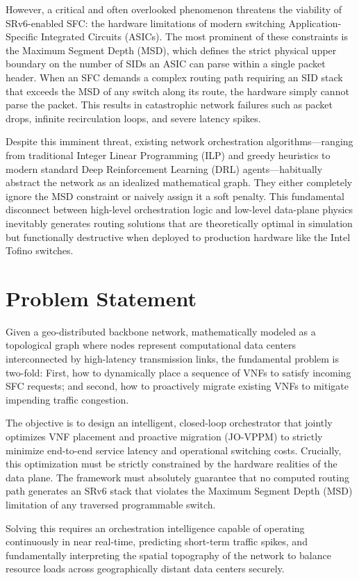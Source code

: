 \documentclass[12pt, a4paper, reqno, oneside]{book}
\begin{document}
However, a critical and often overlooked phenomenon threatens the viability of SRv6-enabled SFC: the hardware limitations of modern switching Application-Specific Integrated Circuits (ASICs). The most prominent of these constraints is the Maximum Segment Depth (MSD), which defines the strict physical upper boundary on the number of SIDs an ASIC can parse within a single packet header. When an SFC demands a complex routing path requiring an SID stack that exceeds the MSD of any switch along its route, the hardware simply cannot parse the packet. This results in catastrophic network failures such as packet drops, infinite recirculation loops, and severe latency spikes. 

Despite this imminent threat, existing network orchestration algorithms—ranging from traditional Integer Linear Programming (ILP) and greedy heuristics to modern standard Deep Reinforcement Learning (DRL) agents—habitually abstract the network as an idealized mathematical graph. They either completely ignore the MSD constraint or naively assign it a soft penalty. This fundamental disconnect between high-level orchestration logic and low-level data-plane physics inevitably generates routing solutions that are theoretically optimal in simulation but functionally destructive when deployed to production hardware like the Intel Tofino switches.

\section{Problem Statement}
Given a geo-distributed backbone network, mathematically modeled as a topological graph where nodes represent computational data centers interconnected by high-latency transmission links, the fundamental problem is two-fold: First, how to dynamically place a sequence of VNFs to satisfy incoming SFC requests; and second, how to proactively migrate existing VNFs to mitigate impending traffic congestion. 

The objective is to design an intelligent, closed-loop orchestrator that jointly optimizes VNF placement and proactive migration (JO-VPPM) to strictly minimize end-to-end service latency and operational switching costs. Crucially, this optimization must be strictly constrained by the hardware realities of the data plane. The framework must absolutely guarantee that no computed routing path generates an SRv6 stack that violates the Maximum Segment Depth (MSD) limitation of any traversed programmable switch. 

Solving this requires an orchestration intelligence capable of operating continuously in near real-time, predicting short-term traffic spikes, and fundamentally interpreting the spatial topography of the network to balance resource loads across geographically distant data centers securely.
\end{document}
